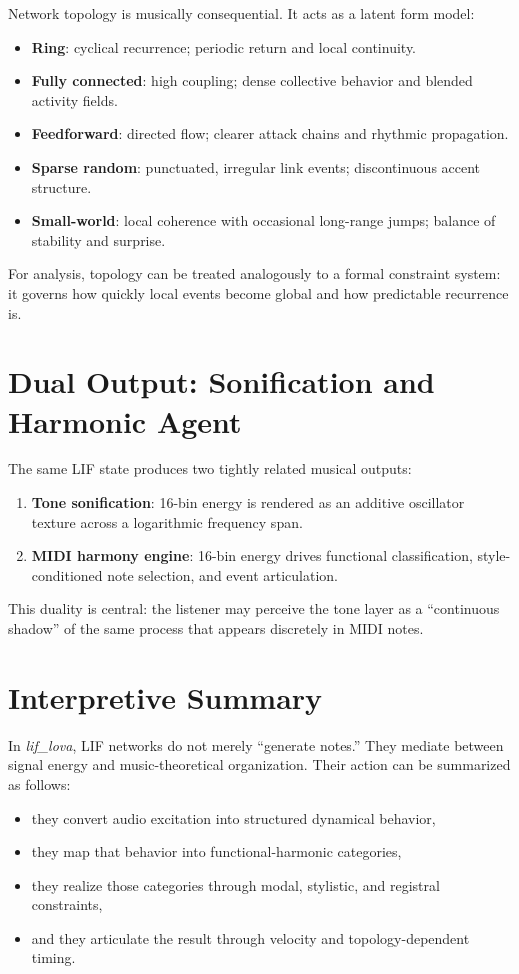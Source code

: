 \documentclass[11pt,a4paper]{article}
\begin{document}
Network topology is musically consequential. It acts as a latent form model:
\begin{itemize}
    \item \textbf{Ring}: cyclical recurrence; periodic return and local continuity.
    \item \textbf{Fully connected}: high coupling; dense collective behavior and blended activity fields.
    \item \textbf{Feedforward}: directed flow; clearer attack chains and rhythmic propagation.
    \item \textbf{Sparse random}: punctuated, irregular link events; discontinuous accent structure.
    \item \textbf{Small-world}: local coherence with occasional long-range jumps;
    balance of stability and surprise.
\end{itemize}

For analysis, topology can be treated analogously to a formal constraint system:
it governs how quickly local events become global and how predictable recurrence is.

\section*{Dual Output: Sonification and Harmonic Agent}

The same LIF state produces two tightly related musical outputs:
\begin{enumerate}[label=\arabic*.]
    \item \textbf{Tone sonification}: 16-bin energy is rendered as an additive oscillator texture
    across a logarithmic frequency span.
    \item \textbf{MIDI harmony engine}: 16-bin energy drives functional classification,
    style-conditioned note selection, and event articulation.
\end{enumerate}

This duality is central: the listener may perceive the tone layer as a ``continuous shadow'' of
the same process that appears discretely in MIDI notes.

\section*{Interpretive Summary}

In \textit{lif\_lova}, LIF networks do not merely ``generate notes.''
They mediate between signal energy and music-theoretical organization.
Their action can be summarized as follows:
\begin{itemize}
    \item they convert audio excitation into structured dynamical behavior,
    \item they map that behavior into functional-harmonic categories,
    \item they realize those categories through modal, stylistic, and registral constraints,
    \item and they articulate the result through velocity and topology-dependent timing.
\end{itemize}
\end{document}
